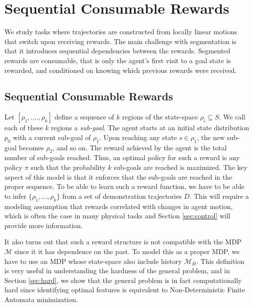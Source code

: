 \section{Sequential Consumable Rewards}\label{sec:seq}
We study tasks where trajectories are constructed from locally linear motions that switch upon receiving rewards.
The main challenge with segmentation is that it introduces sequential dependencies between the rewards.
Segmented rewards are consumable, that is only the agent's first visit to a goal state is rewarded, and conditioned on knowing which previous rewards were received.

\subsection{Sequential Consumable Rewards}
Let $[\rho_1, ...., \rho_k]$ define a sequence of $k$ regions of the state-space $\rho_i \subseteq S$. 
We call each of these $k$ regions a \emph{sub-goal}.
The agent starts at an initial state distribution $p_0$ with a current sub-goal of $\rho_1$. 
Upon reaching any state $s \in \rho_1$, the new sub-goal becomes $\rho_2$, and so on.
The reward achieved by the agent is the total number of sub-goals reached.
Thus, an optimal policy for such a reward is any policy $\pi$ such that the probability $k$ sub-goals are reached is maximized.
The key aspect of this model is that it enforces that the sub-goals are reached in the proper sequence.
To be able to learn such a reward function, we have to be able to infer $\{\rho_1,...,\rho_k\}$ from a set of demonstration trajectories $D$.
This will require a modeling assumption that rewards correlated with changes in agent motion, which is often the case in many physical tasks and Section \ref{sec:control} will provide more information.

It also turns out that such a reward structure is not compatible with the MDP $\mathcal{M}$ since it it has dependence on the past. To model this as a proper MDP, we have to use an MDP whose state-space also include history $\mathcal{M}_H$.
This definition is very useful in understanding the hardness of the general problem, and in Section \ref{sec:hard}, we show that the general problem is in fact computationally hard since identifying optimal features is equivalent to Non-Deterministic Finite Automata minimization.

